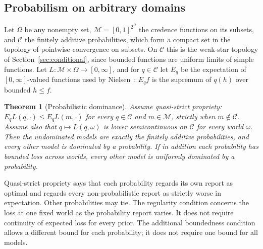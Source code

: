 \documentclass[11pt]{article}
\newtheorem{theorem}{Theorem}[section]
\theoremstyle{definition}
\theoremstyle{remark}
\newcommand{\M}{\mathcal M}
\newcommand{\C}{\mathcal C}
\begin{document}
\subsection{Probabilism on arbitrary domains}\label{sec:nielsen} Let $\Omega$ be any nonempty set, $\M=[0,1]^{2^\Omega}$ the credence functions on its subsets, and $\C$ the finitely additive probabilities, which form a compact set in the topology of pointwise convergence on subsets. On $\C$ this is the weak-star topology of Section~\ref{sec:conditional}, since bounded functions are uniform limits of simple functions. Let $L:\M\times\Omega\to[0,\infty]$, and for $q\in\C$ let $E_q$ be the expectation of $[0,\infty]$-valued functions used by Nielsen~\cite[Appendix A]{Nielsen}: $E_qf$ is the supremum of $q(h)$ over bounded $h\le f$. 
\begin{theorem}[Probabilistic dominance]\label{thm:nielsen}
Assume \emph{quasi-strict propriety}: $E_qL(q,\cdot)\le E_qL(m,\cdot)$ for every $q\in\C$ and $m\in\M$, strictly when $m\notin\C$. Assume also that $q\mapsto L(q,\omega)$ is lower semicontinuous on $\C$ for every world $\omega$. Then the undominated models are exactly the finitely additive probabilities, and every other model is dominated by a probability. If in addition each probability has bounded loss across worlds, every other model is uniformly dominated by a probability.
\end{theorem}
Quasi-strict propriety says that each probability regards its own report as optimal and regards every non-probabilistic report as strictly worse in expectation. Other probabilities may tie. The regularity condition concerns the loss at one fixed world as the probability report varies. It does not require continuity of expected loss for every prior. The additional boundedness condition allows a different bound for each probability; it does not require one bound for all models.
\end{document}
